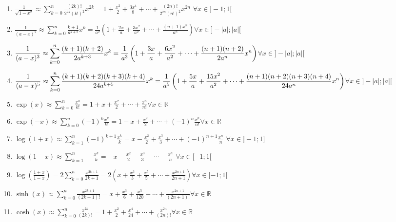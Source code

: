 \documentclass[11pt,a4paper]{article}
\begin{document}
\begin{enumerate}
\item $\displaystyle \frac{1}{\sqrt{1-x^2}} \approx \sum_{k=0}^{n} \frac{(2k)!}{2^{2k}(k!)^2} x^{2k} = 1 + \frac{x^2}{2} + \frac{3x^4}{8} + \cdots +  \frac{(2n)!}{2^{2n}(n!)^2} x^{2n}$ \hfill$\forall x \in ]-1;1[$
\item $\displaystyle \frac{1}{(a-x)^2} \approx \sum_{k=0}^{n} \frac{k+1}{a^{k+2}}x^k = \frac{1}{a^2} \left( 1 + \frac{2x}{a} + \frac{3x^2}{a^2} + \cdots + \frac{(n+1)x^n}{a^n}\right)$\hfill$\forall x \in ]-|a|;|a|[$
\item $\displaystyle \frac{1}{(a-x)^3} \approx \sum_{k=0}^{n} \frac{(k+1)(k+2)}{2a^{k+3}}x^k =\\ \frac{1}{a^3} \left( 1 + \frac{3x}{a} + \frac{6x^2}{a^2} + \cdots + \frac{(n+1)(n+2)}{2a^{n}}x^n \right)$\hfill$\forall x \in ]-|a|;|a|[$
\item $\displaystyle \frac{1}{(a-x)^5} \approx \sum_{k=0}^{n} \frac{(k+1)(k+2)(k+3)(k+4)}{24a^{k+5}}x^k =\\ \frac{1}{a^5} \left( 1 + \frac{5x}{a} + \frac{15x^2}{a^2} + \cdots + \frac{(n+1)(n+2)(n+3)(n+4)}{24a^{n}}x^n \right)$\hfill$\forall x \in ]-|a|;|a|[$
\item $\displaystyle \exp(x) \approx \sum_{k=0}^{n} \frac{x^{k}}{k!} = 1 + x + \frac{x^2}{2} + \cdots + \frac{x^{n}}{n!}$\hfill$\forall x \in \mathbb{R}$
\item $\displaystyle \exp(-x) \approx \sum_{k=0}^{n} (-1)^k\frac{x^{k}}{k!} = 1 - x + \frac{x^2}{2} + \cdots + (-1)^n\frac{x^{n}}{n!}$\hfill$\forall x \in \mathbb{R}$
\item $\displaystyle\log(1+x) \approx \sum_{k=1}^{n} (-1)^{k+1}\frac{x^k}{k} = x - \frac{x^2}{2} + \frac{x^3}{3} + \cdots + (-1)^{n+1}\frac{x^n}{n}$ \hfill$\forall x \in ]-1;1]$
\item $\displaystyle\log(1-x) \approx \sum_{k=1}^{n} -\frac{x^k}{k} = -x -\frac{x^2}{2} - \frac{x^3}{3} -\cdots - \frac{x^n}{n}$ \hfill$\forall x \in [-1;1[$
\item $\displaystyle\log\left(\frac{1+x}{1-x}\right) = 2 \sum_{k=0}^{n} \frac{x^{2k+1}}{2k+1} = 2\left(x + \frac{x^3}{3} + \frac{x^5}{5} + \cdots + \frac{x^{2n+1}}{2n+1}\right)$\hfill$\forall x \in [-1;1[$
\item $\displaystyle\sinh(x) \approx \sum_{k=0}^{n} \frac{x^{2k+1}}{(2k+1)!} = x + \frac{x^3}{6} + \frac{x^5}{120} + \cdots + \frac{x^{2n+1}}{(2n+1)!}$\hfill$\forall x \in \mathbb{R}$
\item $\displaystyle\cosh(x) \approx \sum_{k=0}^{n} \frac{x^{2k}}{(2k)!} = 1 + \frac{x^2}{2} + \frac{x^4}{24} + \cdots + \frac{x^{2n}}{(2n)!}$\hfill$\forall x \in \mathbb{R}$

\end{enumerate}
\end{document}
